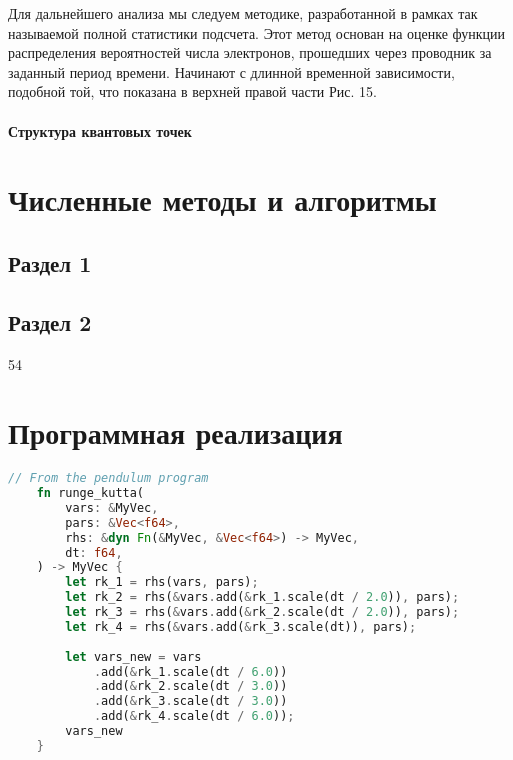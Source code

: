 \documentclass[a4paper,14pt]{extarticle}
\begin{document}
Для дальнейшего анализа мы следуем методике, разработанной в рамках так называемой полной статистики подсчета. Этот метод основан на оценке функции распределения вероятностей числа электронов, прошедших через проводник за заданный период времени. Начинают с длинной временной зависимости, подобной той, что показана в верхней правой части Рис. 15.

\paragraph{Структура квантовых точек}

\pagebreak
\section{Численные методы и алгоритмы}

\subsection{Раздел 1}

\subsection{Раздел 2}
54

\pagebreak
\section{Программная реализация}

\begin{lstlisting}[language=rust,caption={Программная реализация метода Рунге-Кутты},label={listing-1}]
    // From the pendulum program
    fn runge_kutta(
        vars: &MyVec,
        pars: &Vec<f64>,
        rhs: &dyn Fn(&MyVec, &Vec<f64>) -> MyVec,
        dt: f64,
    ) -> MyVec {
        let rk_1 = rhs(vars, pars);
        let rk_2 = rhs(&vars.add(&rk_1.scale(dt / 2.0)), pars);
        let rk_3 = rhs(&vars.add(&rk_2.scale(dt / 2.0)), pars);
        let rk_4 = rhs(&vars.add(&rk_3.scale(dt)), pars);
    
        let vars_new = vars
            .add(&rk_1.scale(dt / 6.0))
            .add(&rk_2.scale(dt / 3.0))
            .add(&rk_3.scale(dt / 3.0))
            .add(&rk_4.scale(dt / 6.0));
        vars_new
    }
    \end{lstlisting}
    
\end{document}
